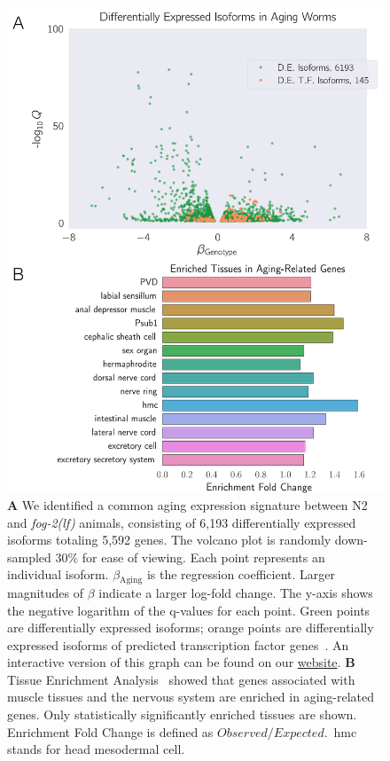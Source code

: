 \documentclass[9pt,twocolumn,twoside]{gsag3jnl}
\newcommand{\fog}{\emph{\mbox{fog-2(lf)}}}
\newcommand{\agen}{5,592}
\newcommand{\webref}{
\href{https://wormlabcaltech.github.io/Angeles_Leighton_2016}{website}}
\begin{document}
\begin{figure}[htbp]
\renewcommand{\familydefault}{\sfdefault}\normalfont{}
\centering
\includegraphics[width=\linewidth]{../../output/figs/final_figs/aging_transcriptomics.pdf}
\caption{
\textbf{A} We identified a common aging expression signature between N2 and
\fog{} animals, consisting of 6,193 differentially expressed isoforms totaling
\agen{} genes. The volcano plot is randomly down-sampled 30\% for ease of
viewing. Each point represents an individual isoform. $\beta{}_\mathrm{Aging}$
is the regression coefficient. Larger magnitudes of $\beta$ indicate a larger
log-fold change. The y-axis shows the negative logarithm of the q-values for
each point. Green points are differentially expressed isoforms; orange points
are differentially expressed isoforms of  predicted transcription factor
genes~\citep{Reece-Hoyes2005}. An interactive version of this graph can be found
on our \webref{}.
\textbf{B} Tissue Enrichment Analysis~\citep{Angeles-Albores2016} showed that
genes associated with muscle tissues and the nervous system are enriched in
aging-related genes. Only statistically significantly enriched tissues are shown.
Enrichment Fold Change is defined as $Observed/Expected$.\ hmc stands for head
mesodermal cell.
}
\label{fig:agingtranscriptome}
\end{figure}
\end{document}
